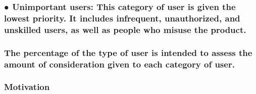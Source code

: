 \documentclass[
]{article}
\begin{document}
\hypertarget{unimportant-users-this-category-of-user-is-given-the-lowest-priority.-it-includes-infrequent-unauthorized-and-unskilled-users-as-well-as-people-who-misuse-the-product.}{%
\subsubsection{\texorpdfstring{● Unimportant users: This category of
user is given the lowest priority. It includes infrequent, unauthorized,
and unskilled users, as well as people who misuse the product.
}{● Unimportant users: This category of user is given the lowest priority. It includes infrequent, unauthorized, and unskilled users, as well as people who misuse the product. }}\label{unimportant-users-this-category-of-user-is-given-the-lowest-priority.-it-includes-infrequent-unauthorized-and-unskilled-users-as-well-as-people-who-misuse-the-product.}}

\hypertarget{the-percentage-of-the-type-of-user-is-intended-to-assess-the-amount-of-consideration-given-to-each-category-of-user.}{%
\subsubsection{\texorpdfstring{The percentage of the type of user is
intended to assess the amount of consideration given to each category of
user.
}{The percentage of the type of user is intended to assess the amount of consideration given to each category of user. }}\label{the-percentage-of-the-type-of-user-is-intended-to-assess-the-amount-of-consideration-given-to-each-category-of-user.}}

\hypertarget{motivation-7}{%
\subsubsection{Motivation}\label{motivation-7}}
\end{document}
